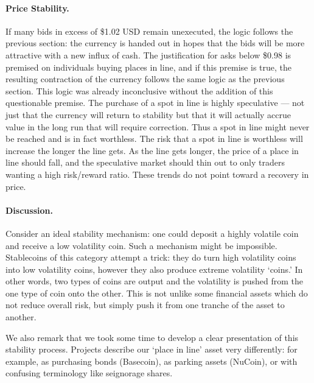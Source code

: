 \paragraph{Price Stability.} If many bids in excess of \$1.02 USD remain unexecuted, the logic follows the previous section: the currency is handed out in hopes that the bids will be more attractive with a new influx of cash. The justification for asks below \$0.98 is premised on individuals buying places in line, and if this premise is true, the resulting contraction of the currency follows the same logic as the previous section. This logic was already inconclusive without the addition of this questionable premise. The purchase of a spot in line is highly speculative --- not just that the currency will return to stability but that it will actually accrue value in the long run that will require correction. Thus a spot in line might never be reached and is in fact worthless. The risk that a spot in line is worthless will increase the longer the line gets. As the line gets longer, the price of a place in line should fall, and the speculative market should thin out to only traders wanting a high risk/reward ratio. These trends do not point toward a recovery in price. 

\paragraph{Discussion.} Consider an ideal stability mechanism: one could deposit a highly volatile coin and receive a low volatility coin. Such a mechanism might be impossible. Stablecoins of this category attempt a trick: they do turn high volatility coins into low volatility coins, however they also produce extreme volatility `coins.' In other words, two types of coins are output and the volatility is pushed from the one type of coin onto the other. This is not unlike some financial assets which do not reduce overall risk, but simply push it from one tranche of the asset to another.

We also remark that we took some time to develop a clear presentation of this stability process. Projects describe our `place in line' asset very differently: for example, as purchasing bonds (Basecoin), as parking assets (NuCoin), or with confusing terminology like seignorage shares. %









